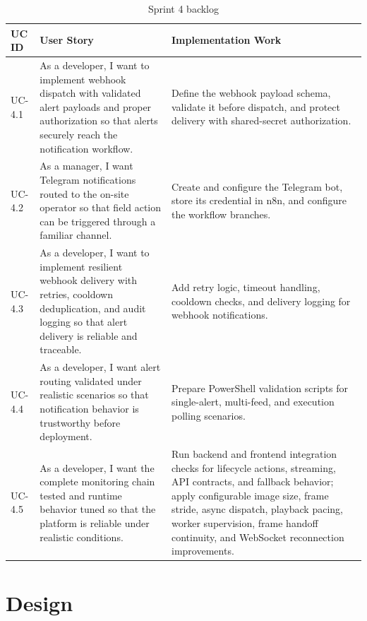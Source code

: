 \begin{table}[H]
    \centering
    \begingroup\setlength{\tabcolsep}{4pt}\renewcommand{\arraystretch}{0.95}\footnotesize
    \begin{tabularx}{\textwidth}{|l|X|X|}
        \hline
        UC ID & User Story & Implementation Work \\ \hline
        UC-4.1 & As a developer, I want to implement webhook dispatch with validated alert payloads and proper authorization so that alerts securely reach the notification workflow. & Define the webhook payload schema, validate it before dispatch, and protect delivery with shared-secret authorization. \\ \hline
        UC-4.2 & As a manager, I want Telegram notifications routed to the on-site operator so that field action can be triggered through a familiar channel. & Create and configure the Telegram bot, store its credential in n8n, and configure the workflow branches. \\ \hline
        UC-4.3 & As a developer, I want to implement resilient webhook delivery with retries, cooldown deduplication, and audit logging so that alert delivery is reliable and traceable. & Add retry logic, timeout handling, cooldown checks, and delivery logging for webhook notifications. \\ \hline
        UC-4.4 & As a developer, I want alert routing validated under realistic scenarios so that notification behavior is trustworthy before deployment. & Prepare PowerShell validation scripts for single-alert, multi-feed, and execution polling scenarios. \\ \hline
        UC-4.5 & As a developer, I want the complete monitoring chain tested and runtime behavior tuned so that the platform is reliable under realistic conditions. & Run backend and frontend integration checks for lifecycle actions, streaming, API contracts, and fallback behavior; apply configurable image size, frame stride, async dispatch, playback pacing, worker supervision, frame handoff continuity, and WebSocket reconnection improvements. \\ \hline
    \end{tabularx}
    \caption{Sprint 4 backlog}
    \label{tab:sprint4_backlog}
    \endgroup
\end{table}

\section{Design}

